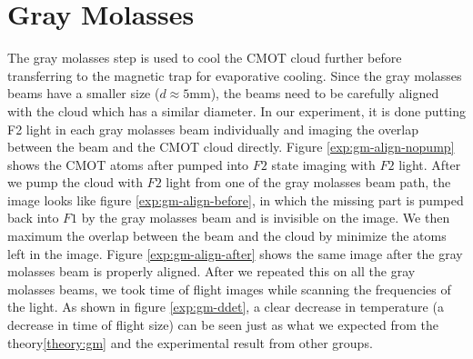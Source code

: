 \section{Gray Molasses}\label{exp:gm}
The gray molasses step is used to cool the CMOT cloud further before transferring to the magnetic trap for evaporative cooling. Since the gray molasses beams have a smaller size ($d\approx5$mm), the beams need to be carefully aligned with the cloud which has a similar diameter. In our experiment, it is done putting F2 light in each gray molasses beam individually and imaging the overlap between the beam and the CMOT cloud directly. Figure \ref{exp:gm-align-nopump} shows the CMOT atoms after pumped into $F2$ state imaging with $F2$ light. After we pump the cloud with $F2$ light from one of the gray molasses beam path, the image looks like figure \ref{exp:gm-align-before}, in which the missing part is pumped back into $F1$ by the gray molasses beam and is invisible on the image. We then maximum the overlap between the beam and the cloud by minimize the atoms left in the image. Figure \ref{exp:gm-align-after} shows the same image after the gray molasses beam is properly aligned. After we repeated this on all the gray molasses beams, we took time of flight images while scanning the frequencies of the light. As shown in figure \ref{exp:gm-ddet}, a clear decrease in temperature (a decrease in time of flight size) can be seen just as what we expected from the theory\ref{theory:gm} and the experimental result from other groups\cite{gm-theory}.
